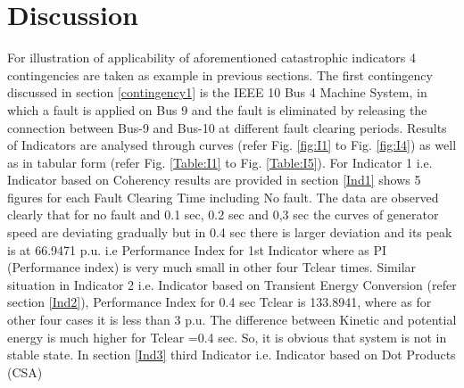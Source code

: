 \section{Discussion}
For illustration of applicability of aforementioned catastrophic
indicators 4 contingencies are taken as example in previous sections. The first contingency discussed in section \ref{contingency1} is the IEEE 10 Bus 4 Machine System, in which a fault is applied on Bus 9 and the fault is eliminated by releasing the connection between Bus-9 and Bus-10 at different fault clearing periods. Results of Indicators are analysed through curves (refer Fig. \ref{fig:I1} to Fig. \ref{fig:I4}) as well as in tabular form (refer Fig. \ref{Table:I1} to Fig. \ref{Table:I5}). For Indicator 1 i.e. Indicator based on Coherency results are provided in section \ref{Ind1} shows 5 figures for each Fault Clearing Time including No fault. The data are observed clearly that for no fault and 0.1 sec, 0.2 sec and 0,3 sec the curves of generator speed are deviating gradually but in 0.4 sec there is larger deviation and its peak is at 66.9471 p.u. i.e Performance Index for 1st Indicator where as PI (Performance index) is very much small in other four Tclear times. Similar situation in Indicator 2 i.e. Indicator based on Transient Energy Conversion (refer section \ref{Ind2}), Performance Index for 0.4 sec Tclear is 133.8941, where as for other four cases it is less than 3 p.u. The difference between Kinetic and potential energy is much higher for Tclear =0.4 sec. So, it is obvious that system is not in stable state. In section \ref{Ind3} third Indicator i.e. Indicator based on Dot Products (CSA)
